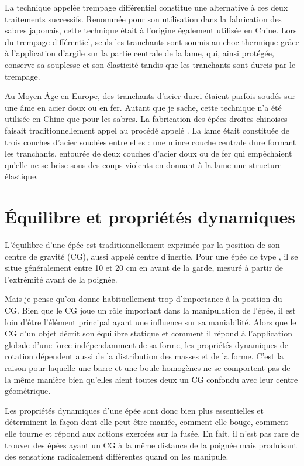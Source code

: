 La technique appelée trempage différentiel constitue une alternative à ces deux traitements successifs. Renommée pour son utilisation dans la fabrication des sabres japonais, cette technique était à l'origine également utilisée en Chine.
Lors du trempage différentiel, seuls les tranchants sont soumis au choc thermique grâce à l'application d'argile sur la partie centrale de la lame, qui, ainsi protégée, conserve sa souplesse et son élasticité tandis que les tranchants sont durcis par le trempage.

Au Moyen-Âge en Europe, des tranchants d'acier durci étaient parfois soudés sur une âme en acier doux ou en fer. Autant que je sache, cette technique n'a été utilisée en Chine que pour les sabres.
La fabrication des épées droites chinoises faisait traditionnellement appel au procédé appelé \SanMei{}. La lame était constituée de trois couches d'acier soudées entre elles : une mince couche centrale dure formant les tranchants, entourée de deux couches d'acier doux ou de fer qui empêchaient qu'elle ne se brise sous des coups violents en donnant à la lame une structure élastique.

\section{Équilibre et propriétés dynamiques}
L'équilibre d'une épée est traditionnellement exprimée par la position de son 
centre de gravité (CG), aussi appelé centre d'inertie. Pour une épée de type \Jian{}, il se situe généralement entre 10 et 20 cm en avant de la garde, mesuré à partir de l'extrémité avant de la poignée.

Mais je pense qu'on donne habituellement trop d'importance à la position du CG. Bien que le CG joue un rôle important dans la manipulation de l'épée, il est loin d'être l'élément principal ayant une influence sur sa maniabilité. Alors que le CG d'un objet décrit son équilibre statique et comment il répond à l'application globale d'une force indépendamment de sa forme, les propriétés dynamiques de rotation dépendent aussi de la distribution des masses et de la forme. C'est la raison pour laquelle une barre et une boule homogènes ne se comportent pas de la même manière bien qu'elles aient toutes deux un CG confondu avec leur centre géométrique.

Les propriétés dynamiques d'une épée sont donc bien plus essentielles et déterminent la façon dont elle peut être maniée, comment elle bouge, comment elle tourne et répond aux actions exercées sur la fusée. En fait, il n'est pas rare de trouver des épées ayant un CG à la même distance de la poignée mais produisant des sensations radicalement différentes quand on les manipule.


